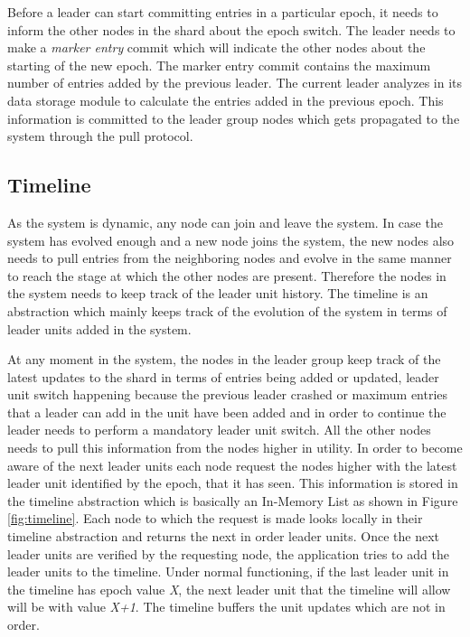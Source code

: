 \documentclass[12pt,a4paper,twoside,openright]{book}
\begin{document}
\par Before a leader can start committing entries in a particular epoch, it needs to inform the other nodes in the shard about the epoch switch. The leader needs to make a \textit{marker entry} commit which will indicate the other nodes about the starting of the new epoch. The marker entry commit contains the maximum number of entries added by the previous leader. The current leader analyzes in its data storage module to calculate the entries added in the previous epoch. This information is committed to the leader group nodes which gets propagated to the system through the pull protocol.

\subsection{Timeline}
\label{ssec:timeline}
As the system is dynamic, any node can join and leave the system. In case the system has evolved enough and a new node joins the system, the new nodes also needs to pull entries from the neighboring nodes and evolve in the same manner to reach the stage at which the other nodes are present. Therefore the nodes in the system needs to keep track of the leader unit history. The timeline is an abstraction which mainly keeps track of the evolution of the system in terms of leader units added in the system.

\par At any moment in the system, the nodes in the leader group keep track of the latest updates to the shard in terms of entries being added or updated, leader unit switch happening because the previous leader crashed or maximum entries that a leader can add in the unit have been added and in order to continue the leader needs to perform a mandatory leader unit switch. All the other nodes needs to pull this information from the nodes higher in utility. In order to become aware of the next leader units each node request the nodes higher with the latest leader unit identified by the epoch, that it has seen. This information is stored in the timeline abstraction which is basically an In-Memory List as shown in Figure \ref{fig:timeline}. Each node to which the request is made looks locally in their timeline abstraction and returns the next in order leader units. Once the next leader units are verified by the requesting node, the application tries to add the leader units to the timeline. Under normal functioning, if the last leader unit in the timeline has epoch value \textit{X}, the next leader unit that the timeline will allow will be with value \textit{X+1}. The timeline buffers the unit updates which are not in order.
\end{document}
